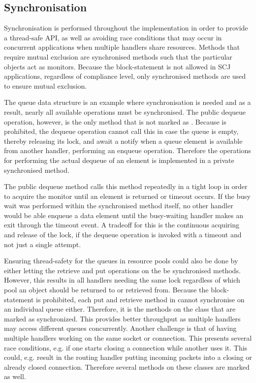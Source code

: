 \subsection{Synchronisation} %
\label{sub:synchronization}
Synchronisation is performed throughout the implementation in order to provide a thread-safe API, as well as avoiding race conditions that may occur in concurrent applications when multiple handlers share resources. Methods that require mutual exclusion are synchronised methods such that the particular objects act as monitors. Because the  block-statement is not allowed in SCJ applications, regardless of compliance level, only synchronised methods are used to ensure mutual exclusion.

The queue data structure is an example where synchronisation is needed and as a result, nearly all available operations must be synchronised. The public dequeue operation, however, is the only method that is not marked as . Because  is prohibited, the dequeue operation cannot call this in case the queue is empty, thereby releasing its lock, and await a notify when a queue element is available from another handler, performing an enqueue operation. Therefore the operations for performing the actual dequeue of an element is implemented in a private synchronised method. 

The public dequeue method calls this method repeatedly in a tight loop in order to acquire the monitor until an element is returned or timeout occurs. If the busy wait was performed within the synchronised method itself, no other handler would be able enqueue a data element until the busy-waiting handler makes an exit through the timeout event. A tradeoff for this is the continuous acquiring and release of the lock, if the dequeue operation is invoked with a timeout and not just a single attempt.

Ensuring thread-safety for the queues in resource pools could also be done by either letting the retrieve and put operations on the  be synchronised methods. However, this results in all handlers needing the same lock regardless of which pool an object should be returned to or retrieved from. Because the  block-statement is prohibited, each put and retrieve method in  cannot synchronise on an individual queue either. Therefore, it is the methods on the  class that are marked as synchronized. This provides better throughput as multiple handlers may access different queues concurrently. Another challenge is that of having multiple handlers working on the same socket or connection. This presents several race conditions, e.g. if one starts closing a connection while another uses it. This could, e.g. result in the routing handler putting incoming packets into a closing or already closed connection. Therefore several methods on these classes are marked  as well.

